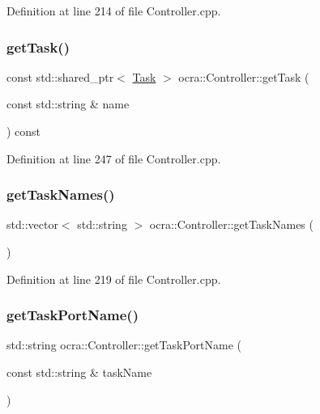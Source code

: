 Definition at line 214 of file Controller.\+cpp.

\hypertarget{classocra_1_1Controller_a239a353ebbc74bedd8ae56d084986211}{}\label{classocra_1_1Controller_a239a353ebbc74bedd8ae56d084986211} 
\subsubsection{\texorpdfstring{get\+Task()}{getTask()}\hspace{0.1cm}{\footnotesize\ttfamily [2/2]}}
{\footnotesize\ttfamily const std\+::shared\+\_\+ptr$<$ \hyperlink{classocra_1_1Task}{Task} $>$ ocra\+::\+Controller\+::get\+Task (\begin{DoxyParamCaption}\item[{const std\+::string \&}]{name }\end{DoxyParamCaption}) const}



Definition at line 247 of file Controller.\+cpp.

\hypertarget{classocra_1_1Controller_abecbaf3846371383eb3c6e8b2fef031b}{}\label{classocra_1_1Controller_abecbaf3846371383eb3c6e8b2fef031b} 
\subsubsection{\texorpdfstring{get\+Task\+Names()}{getTaskNames()}}
{\footnotesize\ttfamily std\+::vector$<$ std\+::string $>$ ocra\+::\+Controller\+::get\+Task\+Names (\begin{DoxyParamCaption}{ }\end{DoxyParamCaption})}



Definition at line 219 of file Controller.\+cpp.

\hypertarget{classocra_1_1Controller_ae037e3554152ec025fbb7df09fba3deb}{}\label{classocra_1_1Controller_ae037e3554152ec025fbb7df09fba3deb} 
\subsubsection{\texorpdfstring{get\+Task\+Port\+Name()}{getTaskPortName()}}
{\footnotesize\ttfamily std\+::string ocra\+::\+Controller\+::get\+Task\+Port\+Name (\begin{DoxyParamCaption}\item[{const std\+::string \&}]{task\+Name }\end{DoxyParamCaption})}



